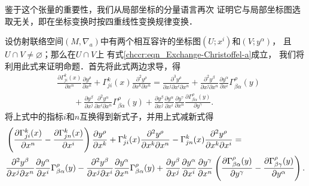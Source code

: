 
鉴于这个张量的重要性，我们从局部坐标的分量语言再次
证明它与局部坐标图选取无关，即在坐标变换时按四重线性变换规律变换．

设仿射联络空间$(M,\nabla_a)$中有两个相互容许的坐标图$(U;x^i)$和$(V;y^\alpha)$，
且$U\cap V \neq \varnothing$；那么在$U\cap V$上
有式\eqref{chccr:eqn_Exchange-Christoffel-a}成立，
我们将利用此式来证明命题．首先将此式两边求导，得
\begin{align*}
    &\frac{\partial \Gamma^{k}_{ji}(x)}{\partial x^n} \frac{\partial y^\rho}{\partial x^k} +
    \Gamma^{k}_{ji}(x) \frac{\partial^2 y^\rho}{\partial x^k\partial x^n} =
    \frac{\partial^3 y^\rho}{\partial x^j \partial x^i \partial x^n}
    +\frac{\partial^2 y^\beta}{\partial x^j\partial x^n}
      \frac{\partial y^\alpha}{\partial x^i} \Gamma^{\rho}_{\beta\alpha}(y) \\
    &\qquad +\frac{\partial y^\beta}{\partial x^j} \frac{\partial^2 y^\alpha}{\partial x^i\partial x^n}
      \Gamma^{\rho}_{\beta\alpha}(y)
    +\frac{\partial y^\beta}{\partial x^j} \frac{\partial y^\alpha}{\partial x^i}
    \frac{\partial y^\gamma}{\partial x^n} \frac{\partial \Gamma^{\rho}_{\beta\alpha}(y)}{\partial y^\gamma} .
\end{align*}
将上式中的指标$i$和$n$互换得到新式子，并用上式减新式得
\begin{align}
    &\left(\frac{\partial \Gamma^{k}_{ji}(x)} {\partial x^n} -\frac{\partial \Gamma^{k}_{jn}(x)}{\partial x^i}\right)
     \frac{\partial y^\rho}{\partial x^k} +
    \Gamma^{k}_{ji}(x) \frac{\partial^2 y^\rho}{\partial x^k\partial x^n}
    -\Gamma^{k}_{jn}(x) \frac{\partial^2 y^\rho}{\partial x^k\partial x^i} =  \label{chccr:eqn_tmprgg} \\
    & \frac{\partial^2 y^\beta}{\partial x^j\partial x^n}
       \frac{\partial y^\alpha}{\partial x^i} \Gamma^{\rho}_{\beta\alpha}(y)
    -  \frac{\partial^2 y^\beta}{\partial x^j\partial x^i}
       \frac{\partial y^\alpha}{\partial x^n} \Gamma^{\rho}_{\beta\alpha}(y)
     +\frac{\partial y^\beta}{\partial x^j} \frac{\partial y^\alpha}
      {\partial x^i} \frac{\partial y^\gamma}{\partial x^n}
      \left( \frac{\partial\Gamma^{\rho}_{\beta\alpha}(y)}{\partial y^\gamma}
    - \frac{\partial\Gamma^{\rho}_{\beta\gamma}(y)}{\partial y^\alpha} \right) . \notag
\end{align}
